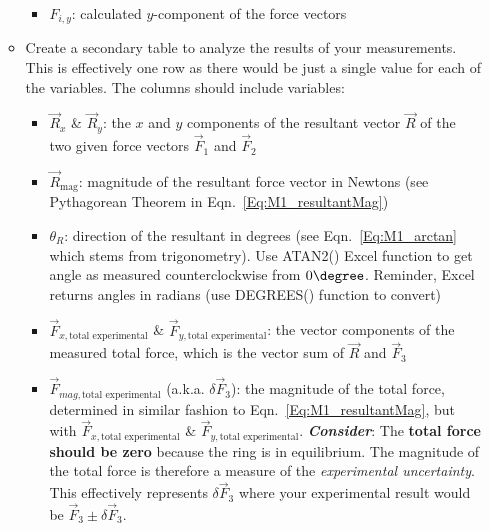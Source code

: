 \begin{enumerate}
\begin{itemize}
\begin{itemize}
        \item $F_{i,y}$: calculated $y$-component of the force vectors
    \end{itemize} 
    \item Create a secondary table to analyze the results of your measurements. This is effectively one row as there would be just a single value for each of the variables. The columns should include variables:
     \begin{itemize}
        \item $\vec{R}_x$ \& $\vec{R}_y$: the $x$ and $y$ components of the resultant vector $\vec{R}$ of the two given force vectors $\vec{F}_1$ and $\vec{F}_2$
        \item $\vec{R}_\text{mag}$: magnitude of the resultant force vector in Newtons (see Pythagorean Theorem in Eqn.~\ref{Eq:M1_resultantMag})
        \item $\theta_{R}$: direction of the resultant in degrees (see Eqn.~\ref{Eq:M1_arctan} which stems from trigonometry). Use ATAN2() Excel function to get angle as measured counterclockwise from $0\degree$. Reminder, Excel returns angles in radians (use DEGREES() function to convert)

        \item $\vec{F}_{x,\text{total experimental}}$ \& $\vec{F}_{y,\text{total experimental}}$: the vector components of the measured total force, which is the vector sum of $\vec{R}$ and $\vec{F}_3$

        \item $\vec{F}_{mag,\text{total experimental}}$ (a.k.a. $\delta \vec{F}_3$): the magnitude of the total force, determined in similar fashion to Eqn.~\ref{Eq:M1_resultantMag}, but with $\vec{F}_{x,\text{total experimental}}$ \& \newline $\vec{F}_{y,\text{total experimental}}$. \textit{\textbf{Consider}}: The \textbf{total force should be zero} because the ring is in equilibrium. The magnitude of the total force is therefore a measure of the \textit{experimental uncertainty}. This effectively represents $\delta \vec{F}_3$ where your experimental result would be $\vec{F}_3 \pm \delta \vec{F}_3$.


\end{itemize}
\end{itemize}
\end{enumerate}
